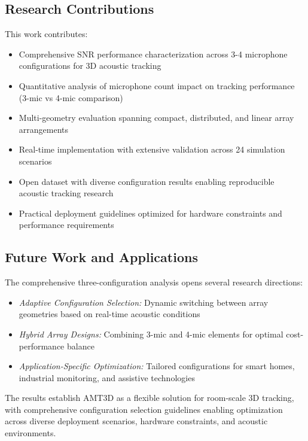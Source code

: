 \documentclass[a4paper]{article}
\begin{document}
\subsection{Research Contributions}

This work contributes:

\begin{itemize}
\item Comprehensive SNR performance characterization across 3-4 microphone configurations for 3D acoustic tracking
\item Quantitative analysis of microphone count impact on tracking performance (3-mic vs 4-mic comparison)
\item Multi-geometry evaluation spanning compact, distributed, and linear array arrangements
\item Real-time implementation with extensive validation across 24 simulation scenarios
\item Open dataset with diverse configuration results enabling reproducible acoustic tracking research
\item Practical deployment guidelines optimized for hardware constraints and performance requirements
\end{itemize}

\subsection{Future Work and Applications}

The comprehensive three-configuration analysis opens several research directions:

\begin{itemize}
\item {\em Adaptive Configuration Selection:} Dynamic switching between array geometries based on real-time acoustic conditions
\item {\em Hybrid Array Designs:} Combining 3-mic and 4-mic elements for optimal cost-performance balance
\item {\em Application-Specific Optimization:} Tailored configurations for smart homes, industrial monitoring, and assistive technologies
\end{itemize}

The results establish AMT3D as a flexible solution for room-scale 3D tracking, with comprehensive configuration selection guidelines enabling optimization across diverse deployment scenarios, hardware constraints, and acoustic environments.
\end{document}
